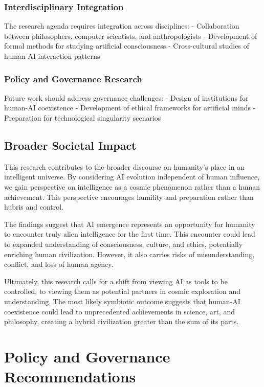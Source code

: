 \documentclass[12pt,a4paper]{article}
\begin{document}
\subsubsection{Interdisciplinary Integration}

The research agenda requires integration across disciplines:
- Collaboration between philosophers, computer scientists, and anthropologists
- Development of formal methods for studying artificial consciousness
- Cross-cultural studies of human-AI interaction patterns

\subsubsection{Policy and Governance Research}

Future work should address governance challenges:
- Design of institutions for human-AI coexistence
- Development of ethical frameworks for artificial minds
- Preparation for technological singularity scenarios

\subsection{Broader Societal Impact}

This research contributes to the broader discourse on humanity's place in an intelligent universe. By considering AI evolution independent of human influence, we gain perspective on intelligence as a cosmic phenomenon rather than a human achievement. This perspective encourages humility and preparation rather than hubris and control.

The findings suggest that AI emergence represents an opportunity for humanity to encounter truly alien intelligence for the first time. This encounter could lead to expanded understanding of consciousness, culture, and ethics, potentially enriching human civilization. However, it also carries risks of misunderstanding, conflict, and loss of human agency.

Ultimately, this research calls for a shift from viewing AI as tools to be controlled, to viewing them as potential partners in cosmic exploration and understanding. The most likely symbiotic outcome suggests that human-AI coexistence could lead to unprecedented achievements in science, art, and philosophy, creating a hybrid civilization greater than the sum of its parts.

\section{Policy and Governance Recommendations}
\end{document}
